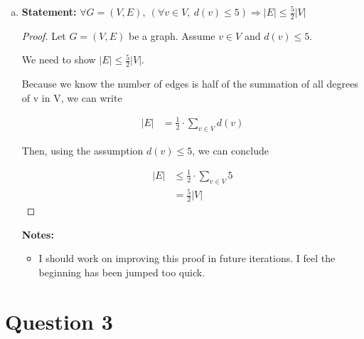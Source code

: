 \documentclass[12pt]{article}
\begin{document}
\begin{enumerate}[a.]
    \newpage

    \item

    \textbf{Statement:} $\forall G = (V,E),\:(\forall v \in V,\:d(v) \leq 5)
    \Rightarrow \lvert E \rvert \leq \frac{5}{2} \lvert V \rvert$

    \bigskip

    \begin{proof}

        Let $G = (V,E)$ be a graph. Assume $v \in V$ and $d(v) \leq 5$.

        \bigskip

        We need to show $\lvert E \rvert \leq \frac{5}{2} \lvert V \rvert$.

        \bigskip

        Because we know the number of edges is half of the summation of all
        degrees of v in V, we can write

        \begin{align}
            \lvert E \rvert &= \frac{1}{2} \cdot \sum\limits_{v \in V} d(v)
        \end{align}

        \bigskip

        Then, using the assumption $d(v) \leq 5$, we can conclude

        \begin{align}
            \lvert E \rvert &\leq \frac{1}{2} \cdot \sum\limits_{v \in V} 5\\
            &= \frac{5}{2} \lvert V \rvert
        \end{align}
    \end{proof}

    \bigskip

    \textbf{Notes:}

    \begin{itemize}
     \item I should work on improving this proof in future iterations. I feel
     the beginning has been jumped too quick.

    \end{itemize}

\end{enumerate}

\section*{Question 3}
\end{document}
